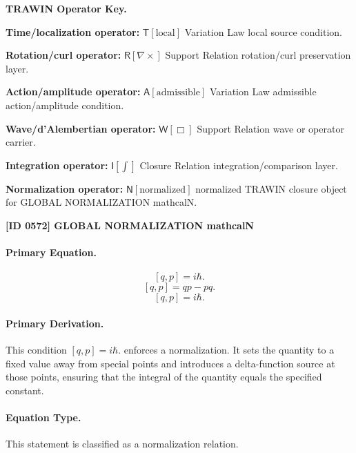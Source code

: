 \par\vspace{0.45\baselineskip}
\noindent\begin{minipage}[t]{\linewidth}
\begingroup
\small
\raggedright
\textbf{TRAWIN Operator Key.}\par
\noindent\textbf{Time/localization operator:} $\mathsf{T}\!\left[\mathrm{local}\right]$ Variation Law local source condition.\par
\noindent\textbf{Rotation/curl operator:} $\mathsf{R}\!\left[\nabla\times\right]$ Support Relation rotation/curl preservation layer.\par
\noindent\textbf{Action/amplitude operator:} $\mathsf{A}\!\left[\mathrm{admissible}\right]$ Variation Law admissible action/amplitude condition.\par
\noindent\textbf{Wave/d'Alembertian operator:} $\mathsf{W}\!\left[\Box\right]$ Support Relation wave or operator carrier.\par
\noindent\textbf{Integration operator:} $\mathsf{I}\!\left[\int\right]$ Closure Relation integration/comparison layer.\par
\noindent\textbf{Normalization operator:} $\mathsf{N}\!\left[\mathrm{normalized}\right]$ normalized TRAWIN closure object for GLOBAL NORMALIZATION mathcalN.\par
\endgroup
\end{minipage}

\clearpage
\noindent\textbf{[ID 0572] GLOBAL NORMALIZATION mathcalN}\par
\vspace{0.35em}
\paragraph{Primary Equation.}
\[
[q,p]=i\hbar.
\]
\[
[q,p]=qp-pq.
\]
\[
\boxed{ [q,p]=i\hbar. }
\]

\paragraph{Primary Derivation.}
This condition \( [q,p]=i\hbar. \) enforces a normalization. It sets the quantity to a fixed value away from special points and introduces a delta-function source at those points, ensuring that the integral of the quantity equals the specified constant.
\paragraph{Equation Type.}
This statement is classified as a normalization relation.

